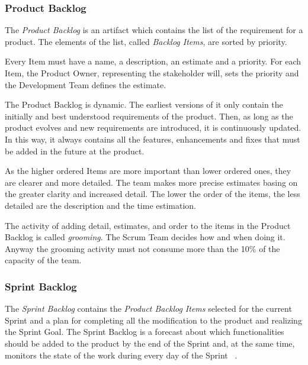 			\subsubsection{Product Backlog}
			The \emph{Product Backlog} is an artifact which contains the list of the requirement for a product. The elements of the list, called \emph{Backlog Items}, are sorted by priority. 

			Every Item must have a name, a description, an estimate and a priority. For each Item, the Product Owner, representing the stakeholder will, sets the priority and	 the Development Team defines the estimate.

			The Product Backlog is dynamic. The earliest versions of it only contain the initially and best understood requirements of the product. Then, as long as the product evolves and new requirements are introduced, it is continuously updated. In this way, it always contains all the features, enhancements and fixes that must be added in the future at the product. 

			As the higher ordered Items are more important than lower ordered ones, they are clearer and more detailed. The team makes more precise estimates basing on the greater clarity and increased detail. The lower the order of the items, the less detailed are the description and the time estimation.
			
			The activity of adding detail, estimates, and order to the items in the Product Backlog is called \emph{grooming}. The Scrum Team decides how and when doing it. Anyway the grooming activity must not consume more than the 10\% of the capacity of the team.
		

			\subsubsection{Sprint Backlog}
			The \emph{Sprint Backlog} contains the \emph{Product Backlog Items} selected for the current Sprint and a plan for completing all the modification to the product and realizing the Sprint Goal. 
			The Sprint Backlog is a forecast about which functionalities should be added to the product by the end of the Sprint and, at the same time, monitors the state of the work during every day of the Sprint ~\cite{scrumEnglishGuide}.
			
